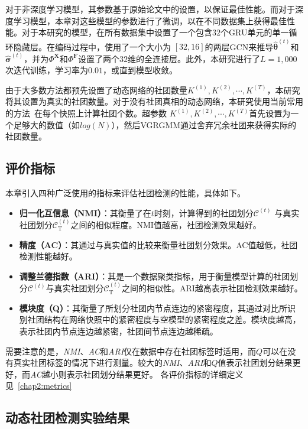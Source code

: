 对于非深度学习模型，其参数基于原始论文中的设置，以保证最佳性能。而对于深度学习模型，本章对这些模型的参数进行了微调，以在不同数据集上获得最佳性能。对于本研究的模型，在所有数据集中设置了一个包含$32$个GRU单元的单一循环隐藏层。在编码过程中，使用了一个大小为 $[32,16]$的两层GCN来推导$\hat{\bm{\theta}}^{(t)}$和$\hat{\bm{\sigma}}^{(t)}$，并为$\Phi^{\mathbf{X}}$和$\Phi^{\mathbf{F}}$设置了两个$32$维的全连接层。此外，本研究进行了$L=1,000$次迭代训练，学习率为$0.01$，或直到模型收敛。

由于大多数方法都预先设置了动态网络的社团数量$K^{(1)}, K^{(2)}, \cdots, K^{(T)}$，本研究将其设置为真实的社团数量。对于没有社团真相的动态网络，本研究使用当前常用的方法~\cite{Krzakala.2013.Zhang}在每个快照上计算社团个数。超参数 $K^{(1)},K^{(2)},\cdots,K^{(T)}$首先设置为一个足够大的数值（如$log(N)$），然后VGRGMM通过舍弃冗余社团来获得实际的社团数量。


\subsection{评价指标}
本章引入四种广泛使用的指标来评估社团检测的性能，具体如下。
\begin{itemize}
  \item \textbf{归一化互信息（NMI）}：其衡量了在$t$时刻，计算得到的社团划分$\mathcal{C}^{(t)}$ 与真实社团划分$\mathcal{C}_{\mathrm{T}}^{(t)}$之间的相似程度。NMI值越高，社团检测效果越好。
\item \textbf{精度（AC）}：其通过与真实值的比较来衡量社团划分效果。AC值越低，社团检测性能越好。

\item \textbf{调整兰德指数（ARI）}：其是一个数据聚类指标，用于衡量模型计算的社团划分$\mathcal{C}^{(t)}$与真实社团划分$\mathcal{C}_{\mathrm{T}}^{(t)}$之间的相似性。ARI越高表示社团检测效果越好。

\item \textbf{模块度（Q）}：其衡量了所划分社团内节点连边的紧密程度，其通过对比所识别社团结构在网络快照中的紧密程度与空模型的紧密程度之差。模块度越高，表示社团内节点连边越紧密，社团间节点连边越稀疏。
\end{itemize}
需要注意的是，\emph{NMI}、\emph{AC}和\emph{ARI}仅在数据中存在社团标签时适用，而$Q$可以在没有真实社团标签的情况下进行测量。较大的\emph{NMI}、\emph{ARI}和$Q$值表示社团划分结果更好，而\emph{AC}越小则表示社团划分结果更好。
各评价指标的详细定义见~\ref{chap2:metrics}




\subsection{动态社团检测实验结果}



